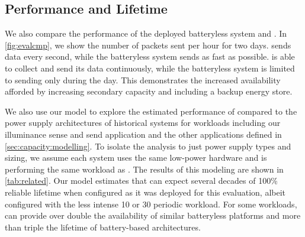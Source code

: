\subsection{\name Performance and Lifetime}

\label{sec:eval:permamote}
We also compare the performance of the
deployed batteryless system and \name. In \cref{fig:evalcmp}, we show the
number of packets sent per hour for two days. \name sends data every
second, while the batteryless system sends as fast as possible. \name is
able to collect and send its data continuously, while the
batteryless system is limited to sending only during the day. This
demonstrates the increased availability afforded by increasing secondary
capacity and including a backup energy store.

We also use our model to explore the estimated performance of \name
compared to the power supply architectures of historical systems for workloads including our illuminance sense and send application and the other applications defined in \cref{sec:capacity:modelling}.
To isolate the analysis to just power supply types and sizing, we assume each
system uses the same low-power hardware and is performing the same workload as \name.
The results of this modeling are shown in \cref{tab:related}. 
Our model estimates that
\name can expect several decades of 100\% reliable lifetime when configured as
it was deployed for this evaluation, albeit configured with the less intense 10 or 30  periodic workload.
For some workloads, \name can provide over double the availability of similar batteryless platforms and more than triple the lifetime of battery-based architectures. 

